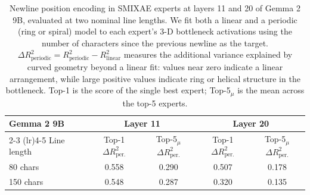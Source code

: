 \begin{table}[htbp]
\centering
\small
\caption{Newline position encoding in SMIXAE experts at layers 11 and 20 of Gemma 2 9B, evaluated at two nominal line lengths. We fit both a linear and a periodic (ring or spiral) model to each expert's 3-D bottleneck activations using the number of characters since the previous newline as the target. $\Delta R^2_{\text{periodic}} = R^2_{\text{periodic}} - R^2_{\text{linear}}$ measures the additional variance explained by curved geometry beyond a linear fit: values near zero indicate a linear arrangement, while large positive values indicate ring or helical structure in the bottleneck. Top-1 is the score of the single best expert; Top-5$_{\mu}$ is the mean across the top-5 experts.}
\label{tab:newline}
\begin{tabular}{l cc cc}
\toprule
\multicolumn{1}{l}{Gemma 2 9B} & \multicolumn{2}{c}{Layer 11} & \multicolumn{2}{c}{Layer 20} \\
\cmidrule(lr){2-3} \cmidrule(lr){4-5}
Line length & Top-1 $\Delta R^2_{\text{per.}}$ & Top-5$_{\mu}$ $\Delta R^2_{\text{per.}}$ & Top-1 $\Delta R^2_{\text{per.}}$ & Top-5$_{\mu}$ $\Delta R^2_{\text{per.}}$ \\
\midrule
80 chars & 0.558 & 0.290 & 0.507 & 0.178 \\
150 chars & 0.548 & 0.287 & 0.320 & 0.135 \\
\bottomrule
\end{tabular}
\end{table}